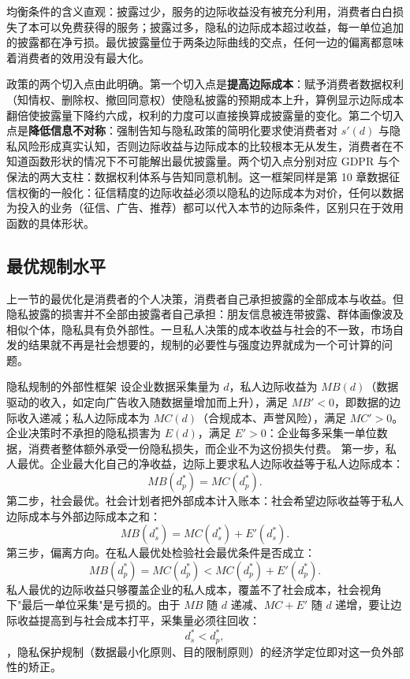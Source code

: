 均衡条件的含义直观：披露过少，服务的边际收益没有被充分利用，消费者白白损失了本可以免费获得的服务；披露过多，隐私的边际成本超过收益，每一单位追加的披露都在净亏损。最优披露量位于两条边际曲线的交点，任何一边的偏离都意味着消费者的效用没有最大化。

政策的两个切入点由此明确。第一个切入点是\textbf{提高边际成本}：赋予消费者数据权利（知情权、删除权、撤回同意权）使隐私披露的预期成本上升，算例显示边际成本翻倍使披露量下降约六成，权利的力度可以直接换算成披露量的变化。第二个切入点是\textbf{降低信息不对称}：强制告知与隐私政策的简明化要求使消费者对 $s'(d)$ 与隐私风险形成真实认知，否则边际收益与边际成本的比较根本无从发生，消费者在不知道函数形状的情况下不可能解出最优披露量。两个切入点分别对应 GDPR 与个保法的两大支柱：数据权利体系与告知同意机制。这一框架同样是第 10 章数据征信权衡的一般化：征信精度的边际收益必须以隐私的边际成本为对价，任何以数据为投入的业务（征信、广告、推荐）都可以代入本节的边际条件，区别只在于效用函数的具体形状。

\subsection{最优规制水平}

上一节的最优化是消费者的个人决策，消费者自己承担披露的全部成本与收益。但隐私披露的损害并不全部由披露者自己承担：朋友信息被连带披露、群体画像波及相似个体，隐私具有负外部性。一旦私人决策的成本收益与社会的不一致，市场自发的结果就不再是社会想要的，规制的必要性与强度边界就成为一个可计算的问题。

\begin{derivation}{隐私规制的外部性框架}{}
设企业数据采集量为 $d$，私人边际收益为 $MB(d)$（数据驱动的收入，如定向广告收入随数据量增加而上升），满足 $MB'<0$，即数据的边际收入递减；私人边际成本为 $MC(d)$（合规成本、声誉风险），满足 $MC'>0$。企业决策时不承担的隐私损害为 $E(d)$，满足 $E'>0$：企业每多采集一单位数据，消费者整体额外承受一份隐私损失，而企业不为这份损失付费。
第一步，私人最优。企业最大化自己的净收益，边际上要求私人边际收益等于私人边际成本：
\[
MB(d_p^*) = MC(d_p^*).
\]
第二步，社会最优。社会计划者把外部成本计入账本：社会希望边际收益等于私人边际成本与外部边际成本之和：
\[
MB(d_s^*) = MC(d_s^*) + E'(d_s^*).
\]
第三步，偏离方向。在私人最优处检验社会最优条件是否成立：
\[
MB(d_p^*) = MC(d_p^*) < MC(d_p^*) + E'(d_p^*).
\]
私人最优的边际收益只够覆盖企业的私人成本，覆盖不了社会成本，社会视角下"最后一单位采集"是亏损的。由于 $MB$ 随 $d$ 递减、$MC + E'$ 随 $d$ 递增，要让边际收益提高到与社会成本打平，采集量必须往回收：
\[
d_s^* < d_p^*,
\]
，隐私保护规制（数据最小化原则、目的限制原则）的经济学定位即对这一负外部性的矫正。
\end{derivation}

